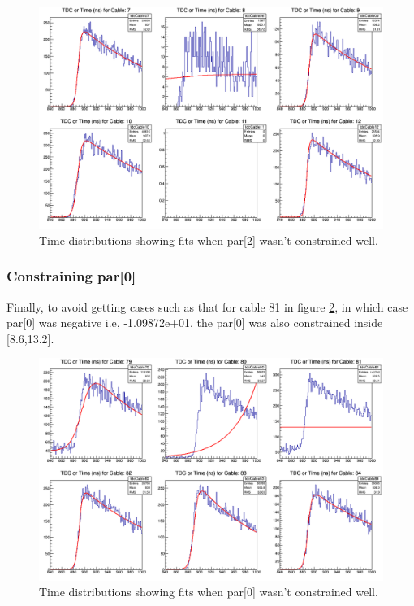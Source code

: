 \documentclass[12pt,epsfig]{article}
\begin{document}
\begin{figure}
    \centering
    \includegraphics[width=1.0\textwidth]{Figures/tdcForRun068_Cables07to12.png}
    \caption{Time distributions showing fits when par[2] wasn't constrained well.}
    \label{tdcFlatFit}
\end{figure}



\subsubsection{Constraining par[0]}
Finally, to avoid getting cases such as that for cable 81 in figure \ref{tdcNoSigm}, 
in which case par[0] was negative i.e, -1.09872e+01, the par[0] was also constrained inside [8.6,13.2].
\begin{figure}
    \centering
    \includegraphics[width=1.0\textwidth]{Figures/tdcForRun068_Cables79to84nw0.png}
    \caption{Time distributions showing fits when par[0] wasn't constrained well.}
    \label{tdcNoSigm}
\end{figure}
\end{document}
